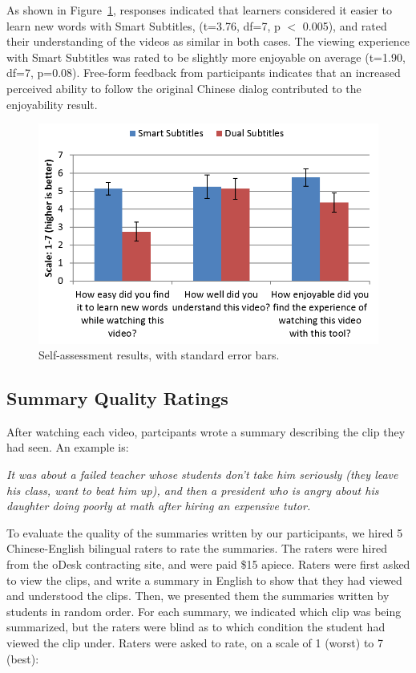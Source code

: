 \documentclass{sigchi}
\begin{document}
As shown in Figure~\ref{fig:figure8}, responses indicated that learners considered it easier to learn new words with Smart Subtitles, (t=3.76, df=7, p $<$ 0.005), and rated their understanding of the videos as similar in both cases. The viewing experience with Smart Subtitles was rated to be slightly more enjoyable on average (t=1.90, df=7, p=0.08). Free-form feedback from participants indicates that an increased perceived ability to follow the original Chinese dialog contributed to the enjoyability result.

\begin{figure}[!h]
\centering
\includegraphics[width=\columnwidth]{self-assessment-results}
\caption{Self-assessment results, with standard error bars.}
\label{fig:figure8}
\end{figure}

\subsection{Summary Quality Ratings}

After watching each video, partcipants wrote a summary describing the clip they had seen. An example is:

\emph{It was about a failed teacher whose students don't take him seriously (they leave his class, want to beat him up), and then a president who is angry about his daughter doing poorly at math after hiring an expensive tutor.}

To evaluate the quality of the summaries written by our participants, we hired 5 Chinese-English bilingual raters to rate the summaries. The raters were hired from the oDesk contracting site, and were paid \$15 apiece. Raters were
first asked to view the clips, and write a summary in English to show that they had viewed and understood the clips.
Then, we presented them the summaries
written by students in random order. For each summary, we indicated which clip was being summarized, but the raters were blind as to which condition the student had viewed the clip under. Raters were asked to rate, on a scale of 1 (worst) to 7 (best):
\end{document}
